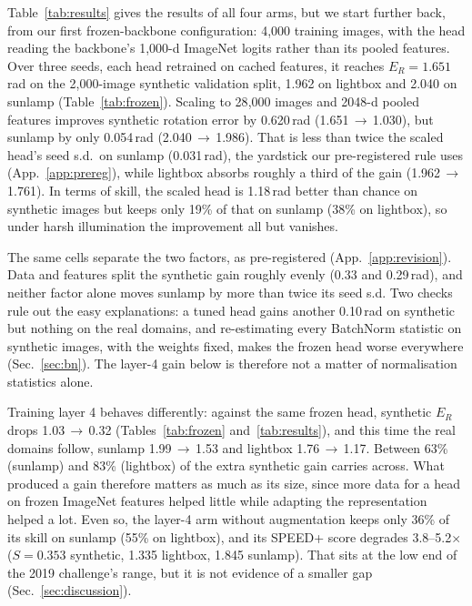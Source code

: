 \documentclass{article}
\newcommand{\Erot}{E_{R}}
\begin{document}
Table~\ref{tab:results} gives the results of all four arms, but we start further back, from our
first frozen-backbone configuration: 4{,}000 training images, with the head
reading the backbone's 1{,}000-d ImageNet logits rather than its pooled features. Over three
seeds, each head retrained on cached features, it reaches $\Erot = 1.651$\,rad on the
2{,}000-image synthetic validation split, 1.962 on lightbox and 2.040 on sunlamp
(Table~\ref{tab:frozen}). Scaling to 28{,}000 images and 2048-d pooled features improves
synthetic rotation error by 0.620\,rad (1.651\,$\to$\,1.030), but sunlamp by only 0.054\,rad
(2.040\,$\to$\,1.986). That is less than twice the scaled head's seed s.d.\ on sunlamp
(0.031\,rad), the yardstick our pre-registered rule uses (App.~\ref{app:prereg}), while
lightbox absorbs roughly a third of the gain (1.962\,$\to$\,1.761). In terms of skill, the
scaled head is 1.18\,rad better than chance on synthetic images but keeps only 19\% of that on
sunlamp (38\% on lightbox), so under harsh illumination the improvement all but vanishes.

The same cells separate the two factors, as pre-registered (App.~\ref{app:revision}). Data and
features split the synthetic gain roughly evenly (0.33 and 0.29\,rad), and neither factor alone
moves sunlamp by more than twice its seed s.d. Two checks rule out the easy explanations: a
tuned head gains another 0.10\,rad on synthetic but nothing on the real domains, and
re-estimating every BatchNorm statistic on synthetic images, with the weights fixed, makes the
frozen head worse everywhere (Sec.~\ref{sec:bn}). The layer-4 gain below is therefore not a
matter of normalisation statistics alone.



Training layer 4 behaves differently: against the same frozen head, synthetic $\Erot$ drops
1.03\,$\to$\,0.32 (Tables~\ref{tab:frozen} and~\ref{tab:results}), and this time the real
domains follow, sunlamp 1.99\,$\to$\,1.53 and lightbox 1.76\,$\to$\,1.17. Between 63\%
(sunlamp) and 83\% (lightbox) of the extra synthetic gain carries across. What produced a gain
therefore matters as much as its size, since more data for a head on frozen ImageNet features
helped little while adapting the representation helped a lot. Even so, the layer-4 arm without
augmentation keeps only 36\% of its skill on sunlamp (55\% on lightbox), and its SPEED+ score
degrades 3.8--5.2$\times$ ($S{=}0.353$ synthetic, 1.335 lightbox, 1.845 sunlamp). That sits
at the low end of the 2019 challenge's range, but it is not evidence of a smaller gap
(Sec.~\ref{sec:discussion}).
\end{document}
